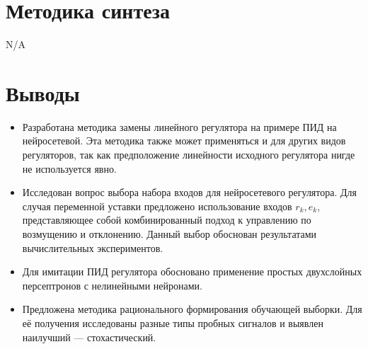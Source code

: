 \section{Методика синтеза}

{\LARGE N/A}

\section{Выводы}

\begin{itemize}

\item Разработана методика замены линейного регулятора на примере ПИД
  на нейросетевой.  Эта методика также может применяться и для других
  видов регуляторов, так как предположение линейности исходного
  регулятора нигде не используется явно.

\item Исследован вопрос выбора набора входов для нейросетевого
  регулятора.  Для случая переменной уставки предложено использование
  входов $r_k,e_k$, представляющее собой комбинированный подход к
  управлению по возмущению и отклонению.  Данный выбор обоснован
  результатами вычислительных экспериментов.

\item Для имитации ПИД регулятора обосновано применение простых
  двухслойных персептронов с нелинейными нейронами.

\item Предложена методика рационального формирования обучающей
  выборки.  Для её получения исследованы разные типы пробных сигналов
  и выявлен наилучший --- стохастический.



\end{itemize}
